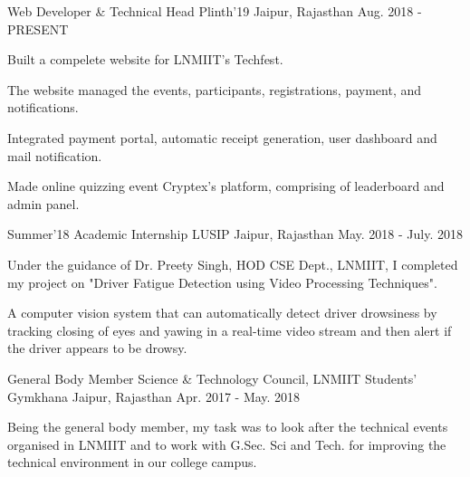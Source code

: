 

\begin{cventries}

  \cventry
    {Web Developer \& Technical Head} %
    {Plinth'19} %
    {Jaipur, Rajasthan} %
    {Aug. 2018 - PRESENT} %
    {
      \begin{cvitems} %
        \item {Built a compelete website for LNMIIT's Techfest.}
        \item {The website managed the events, participants, registrations, payment, and notifications.}
        \item {Integrated payment portal, automatic receipt generation, user dashboard and mail notification.}
        \item {Made online quizzing event Cryptex's platform, comprising of leaderboard and admin panel.}
      \end{cvitems}
    }

  \cventry
    {Summer'18 Academic Internship} %
    {LUSIP} %
    {Jaipur, Rajasthan} %
    {May. 2018 - July. 2018} %
    {
      \begin{cvitems} %
        \item {Under the guidance of Dr. Preety Singh, HOD CSE Dept., LNMIIT, I completed my project on "Driver Fatigue Detection using Video Processing Techniques".}
        \item {A computer vision system that can automatically detect driver drowsiness by tracking closing of eyes and yawing in a real-time video stream and then alert if the driver appears to be drowsy.}
      \end{cvitems}
    }

  \cventry
    {General Body Member} %
    {Science \& Technology Council, LNMIIT Students' Gymkhana} %
    {Jaipur, Rajasthan} %
    {Apr. 2017 - May. 2018} %
    {
      \begin{cvitems} %
        \item {Being the general body member, my task was to look after the technical events organised in LNMIIT and to work with G.Sec. Sci and Tech. for improving the technical environment in our college campus.}
      \end{cvitems}
    }


\end{cventries}
